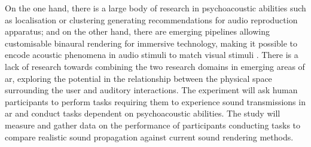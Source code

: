 On the one hand, there is a large body of research in psychoacoustic abilities such as localisation or clustering \citep{lee2011relationship} generating recommendations for audio reproduction apparatus; and on the other hand, there are emerging pipelines allowing customisable binaural rendering for immersive technology, making it possible to encode acoustic phenomena in audio stimuli to match visual stimuli \citep{plinge2018six}. There is a lack of research towards combining the two research domains in emerging areas of \acrshort{ar}, exploring the potential in the relationship between the physical space surrounding the user and auditory interactions. The experiment will ask human participants to perform tasks requiring them to experience sound transmissions in \acrshort{ar} and conduct tasks dependent on psychoacoustic abilities. The study will measure and gather data on the performance of participants conducting tasks to compare realistic sound propagation against current sound rendering methods.\par

